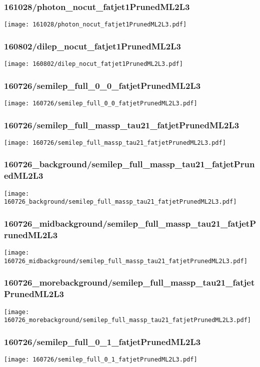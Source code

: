 \begin{frame}
   \frametitle{\small 161028/photon\_nocut\_fatjet1PrunedML2L3}
   \centering
   \texttt{[image: 161028/photon\_nocut\_fatjet1PrunedML2L3.pdf]}
\end{frame}

\begin{frame}
   \frametitle{\small 160802/dilep\_nocut\_fatjet1PrunedML2L3}
   \centering
   \texttt{[image: 160802/dilep\_nocut\_fatjet1PrunedML2L3.pdf]}
\end{frame}

\begin{frame}
   \frametitle{\small 160726/semilep\_full\_0\_0\_fatjetPrunedML2L3}
   \centering
   \texttt{[image: 160726/semilep\_full\_0\_0\_fatjetPrunedML2L3.pdf]}
\end{frame}

\begin{frame}
   \frametitle{\small 160726/semilep\_full\_massp\_tau21\_fatjetPrunedML2L3}
   \centering
   \texttt{[image: 160726/semilep\_full\_massp\_tau21\_fatjetPrunedML2L3.pdf]}
\end{frame}

\begin{frame}
   \frametitle{\small 160726\_background/semilep\_full\_massp\_tau21\_fatjetPrunedML2L3}
   \centering
   \texttt{[image: 160726\_background/semilep\_full\_massp\_tau21\_fatjetPrunedML2L3.pdf]}
\end{frame}

\begin{frame}
   \frametitle{\small 160726\_midbackground/semilep\_full\_massp\_tau21\_fatjetPrunedML2L3}
   \centering
   \texttt{[image: 160726\_midbackground/semilep\_full\_massp\_tau21\_fatjetPrunedML2L3.pdf]}
\end{frame}

\begin{frame}
   \frametitle{\small 160726\_morebackground/semilep\_full\_massp\_tau21\_fatjetPrunedML2L3}
   \centering
   \texttt{[image: 160726\_morebackground/semilep\_full\_massp\_tau21\_fatjetPrunedML2L3.pdf]}
\end{frame}

\begin{frame}
   \frametitle{\small 160726/semilep\_full\_0\_1\_fatjetPrunedML2L3}
   \centering
   \texttt{[image: 160726/semilep\_full\_0\_1\_fatjetPrunedML2L3.pdf]}
\end{frame}

